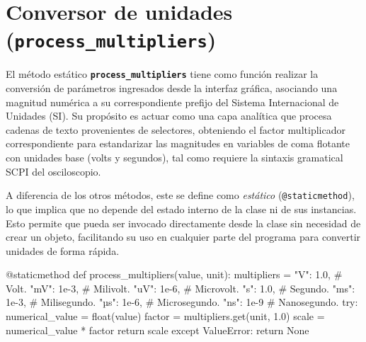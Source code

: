 \section{Conversor de unidades (\texttt{process\_multipliers})}
El método estático \textbf{\texttt{process\_multipliers}} tiene como función realizar la conversión de parámetros ingresados desde la interfaz gráfica, asociando una magnitud numérica a su correspondiente prefijo del Sistema Internacional de Unidades (SI). Su propósito es actuar como una capa analítica que procesa cadenas de texto provenientes de selectores, obteniendo el factor multiplicador correspondiente para estandarizar las magnitudes en variables de coma flotante con unidades base (volts y segundos), tal como requiere la sintaxis gramatical SCPI del osciloscopio.\par
A diferencia de los otros métodos, este se define como \textit{estático} (\texttt{@staticmethod}), lo que implica que no depende del estado interno de la clase ni de sus instancias. Esto permite que pueda ser invocado directamente desde la clase sin necesidad de crear un objeto, facilitando su uso en cualquier parte del programa para convertir unidades de forma rápida.

\begin{python}
@staticmethod
def process_multipliers(value, unit):
    multipliers = {
        "V": 1.0,        # Volt.
        "mV": 1e-3,      # Milivolt.
        "uV": 1e-6,      # Microvolt.
        "s": 1.0,        # Segundo.
        "ms": 1e-3,      # Milisegundo.
        "µs": 1e-6,      # Microsegundo.
        "ns": 1e-9       # Nanosegundo.
    }
    try:
        numerical_value = float(value)
        factor = multipliers.get(unit, 1.0)
        scale = numerical_value * factor
        return scale
    except ValueError:
        return None
\end{python}

